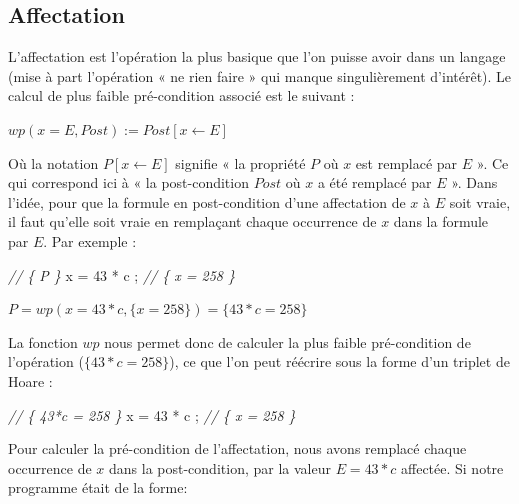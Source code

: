 \documentclass[12pt,francais,]{scrbook}
\newenvironment{Shaded}{}{}
\newcommand{\DecValTok}[1]{\textcolor[rgb]{0.25,0.63,0.44}{{#1}}}
\newcommand{\CommentTok}[1]{\textcolor[rgb]{0.38,0.63,0.69}{\textit{{#1}}}}
\newcommand{\NormalTok}[1]{{#1}}
\begin{document}
\subsection{Affectation}\label{affectation}

L'affectation est l'opération la plus basique que l'on puisse avoir dans
un langage (mise à part l'opération « ne rien faire » qui manque
singulièrement d'intérêt). Le calcul de plus faible pré-condition
associé est le suivant :

\begin{center} \(wp(x = E , Post) := Post[x \leftarrow E]\)
\end{center}

Où la notation \(P[x \leftarrow E]\) signifie « la propriété \(P\) où
\(x\) est remplacé par \(E\) ». Ce qui correspond ici à « la
post-condition \(Post\) où \(x\) a été remplacé par \(E\) ». Dans
l'idée, pour que la formule en post-condition d'une affectation de \(x\)
à \(E\) soit vraie, il faut qu'elle soit vraie en remplaçant chaque
occurrence de \(x\) dans la formule par \(E\). Par exemple :

\begin{footnotesize}\begin{Shaded}
\begin{Highlighting}[]
\CommentTok{// \{ P \}}
\NormalTok{x = }\DecValTok{43} \NormalTok{* c ;}
\CommentTok{// \{ x = 258 \}}
\end{Highlighting}
\end{Shaded}\end{footnotesize}

\begin{center} \(P = wp(x = 43*c , \{x = 258\}) = \{43*c = 258\}\)
\end{center}

La fonction \(wp\) nous permet donc de calculer la plus faible
pré-condition de l'opération (\(\{43*c = 258\}\)), ce que l'on peut
réécrire sous la forme d'un triplet de Hoare :

\begin{footnotesize}\begin{Shaded}
\begin{Highlighting}[]
\CommentTok{// \{ 43*c = 258 \}}
\NormalTok{x = }\DecValTok{43} \NormalTok{* c ;}
\CommentTok{// \{ x = 258 \}}
\end{Highlighting}
\end{Shaded}\end{footnotesize}

Pour calculer la pré-condition de l'affectation, nous avons remplacé
chaque occurrence de \(x\) dans la post-condition, par la valeur
\(E = 43*c\) affectée. Si notre programme était de la forme:
\end{document}
